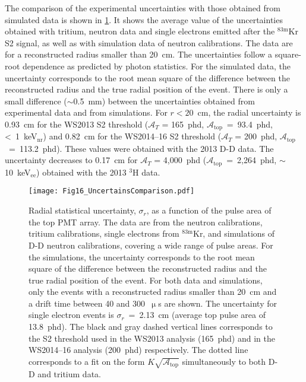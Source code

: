 \documentclass[a4paper,11pt]{article}
\begin{document}
The comparison of the experimental uncertainties with those obtained from simulated data is shown in \cref{Fig22_UncertainsComparison}. It shows the average value of the uncertainties obtained with  tritium, neutron data and single electrons emitted after the ${}^{\mathrm{83m}}$Kr S2 signal, as well as with simulation data of neutron calibrations. The data are for a reconstructed radius smaller than 20~cm. The uncertainties follow a square-root dependence as predicted by photon statistics. For the simulated data, the uncertainty corresponds to the root mean square of the difference between the reconstructed radius and the true radial position of the event. There is only a small difference ($\sim$0.5~mm) between the uncertainties obtained from experimental data and from simulations. For $r < 20$~cm, the radial uncertainty is 0.93~cm for the WS2013 S2 threshold ($\mathcal{A}_T$ = 165~phd, $\mathcal{A}_{\mathrm{top}}$~=~93.4~phd, <~1~keV$_{\mathrm{nr}}$) and 0.82~cm for the WS2014--16 S2 threshold ($\mathcal{A}_T$ = 200~phd, $\mathcal{A}_{\mathrm{top}}$~=~113.2~phd). These values were obtained with the 2013 D-D data. The uncertainty decreases to 0.17~cm for $\mathcal{A}_T$ = 4,000~phd  ($\mathcal{A}_{\mathrm{top}}$~=~2,264~phd, $\sim$10~keV$_{\mathrm{ee}}$) obtained with the 2013 ${}^{3}$H data.

\begin{figure}
 \begin{center}
   \texttt{[image: Fig16\_UncertainsComparison.pdf]}	
\caption{Radial statistical uncertainty, $\sigma_r$, as a function of the pulse area of the top PMT array. The data are from the neutron calibrations, tritium calibrations, single electrons from ${}^{\textrm{83m}}$Kr, and simulations of D-D neutron calibrations, covering a wide range of pulse areas. For the simulations, the uncertainty corresponds to the root mean square of the difference between the reconstructed radius and the true radial position of the event. For both data and simulations, only the events with a reconstructed radius smaller than 20~cm and a drift time between 40 and 300~$\upmu$s are shown. The uncertainty for single electron events is $\sigma_r$~=~2.13~cm (average top pulse area of 13.8~phd). The black and gray dashed vertical lines corresponds to the S2 threshold used in the WS2013 analysis (165~phd) and in the WS2014--16 analysis (200~phd) respectively. The dotted line corresponds to a fit on the form $K\sqrt{\mathcal{A}_{\mathrm{top}}}$ simultaneously to both D-D and tritium data.}
  \label{Fig22_UncertainsComparison}
 \end{center}
\end{figure}
\end{document}
